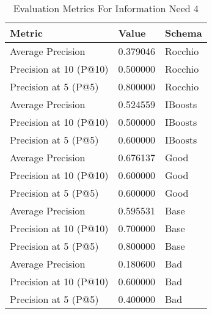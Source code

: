 \begingroup
    \renewcommand{\arraystretch}{2} %
    \begin{table}[!h]
        \centering
        \begin{tabular}{l | l | l}
            Metric & Value & Schema \\
            \hline
            Average Precision & 0.379046 & Rocchio \\
            Precision at 10 (P@10) & 0.500000 & Rocchio \\
            Precision at 5 (P@5) & 0.800000 & Rocchio \\
            \hline
            Average Precision & 0.524559 & IBoosts \\
            Precision at 10 (P@10) & 0.500000 & IBoosts \\
            Precision at 5 (P@5) & 0.600000 & IBoosts \\
            \hline
            Average Precision & 0.676137 & Good\\
            Precision at 10 (P@10) & 0.600000 & Good\\
            Precision at 5 (P@5) & 0.600000 & Good\\
            \hline
            Average Precision & 0.595531 & Base\\
            Precision at 10 (P@10) & 0.700000 & Base\\
            Precision at 5 (P@5) & 0.800000 & Base \\
            \hline
            Average Precision & 0.180600 & Bad\\
            Precision at 10 (P@10) & 0.600000 & Bad\\
            Precision at 5 (P@5) & 0.400000 & Bad\\
        \end{tabular}
        \caption{Evaluation Metrics For Information Need 4}
        \label{tab:metrics-info-4-2}
    \end{table}
\endgroup

